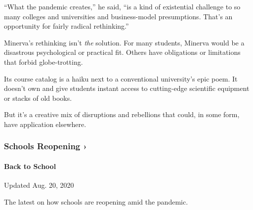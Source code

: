 ``What the pandemic creates,'' he said, ``is a kind of existential
challenge to so many colleges and universities and business-model
presumptions. That's an opportunity for fairly radical rethinking.''

Minerva's rethinking isn't \emph{the} solution. For many students,
Minerva would be a disastrous psychological or practical fit. Others
have obligations or limitations that forbid globe-trotting.

Its course catalog is a haiku next to a conventional university's epic
poem. It doesn't own and give students instant access to cutting-edge
scientific equipment or stacks of old books.

But it's a creative mix of disruptions and rebellions that could, in
some form, have application elsewhere.

\href{https://www.nytimes3xbfgragh.onion/spotlight/schools-reopening?action=click\&pgtype=Article\&state=default\&region=MAIN_CONTENT_3\&context=storylines_keepup}{}

\hypertarget{schools-reopening-}{%
\subsubsection{Schools Reopening ›}\label{schools-reopening-}}

\hypertarget{back-to-school}{%
\paragraph{Back to School}\label{back-to-school}}

Updated Aug. 20, 2020

The latest on how schools are reopening amid the pandemic.

